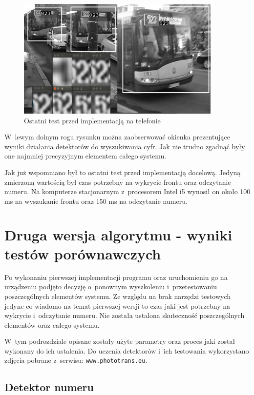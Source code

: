 \begin{figure}[!h]
    \centering
    \includegraphics[width=0.9\textwidth]{img/exp_final_test}
    \caption{Ostatni test przed implementacją na telefonie}
    \label{fig:finaltest}
\end{figure}

W~lewym dolnym rogu rysunku można zaobserwować okienka prezentujące
wyniki działania detektorów do wyszukiwania cyfr. Jak nie trudno
zgadnąć były one najmniej precyzyjnym elementem całego systemu.

Jak już wspomniano był to ostatni test przed implementacją 
docelową. Jedyną zmierzoną wartością był czas potrzebny na wykrycie
frontu oraz odczytanie numeru. Na komputerze stacjonarnym z~procesorem
Intel i5 wynosił on około 100 ms na wyszukanie frontu oraz 150 ms na
odczytanie numeru. 


\section{Druga wersja algorytmu - wyniki testów porównawczych}

Po wykonaniu pierwszej implementacji programu oraz 
uruchomieniu go na urządzeniu podjęto decyzję o~ponownym 
wyszkoleniu i~przetestowaniu poszczególnych elementów systemu.
Ze względu na brak narzędzi testowych jedyne co wiadomo 
na temat pierwszej wersji to czas jaki jest potrzebny
na wykrycie i~odczytanie numeru.
Nie została ustalona skuteczność poszczególnych
elementów oraz całego systemu.

W~tym podrozdziale opisane zostały użyte parametry oraz proces
jaki został wykonany do ich ustalenia. Do uczenia detektorów
i~ich testowania wykorzystano zdjęcia pobrane z~serwisu:
\verb|www.phototrans.eu|.


\subsection{Detektor numeru}

